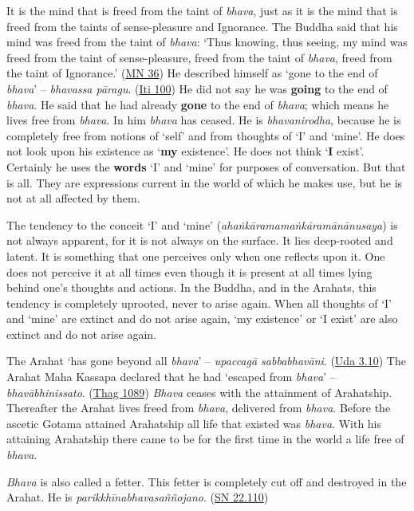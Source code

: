 It is the mind that is freed from the taint of \emph{bhava}, just as it is the mind that is freed from the taints of sense-pleasure and Ignorance. The Buddha said that his mind was freed from the taint of \emph{bhava}: `Thus knowing, thus seeing, my mind was freed from the taint of sense-pleasure, freed from the taint of \emph{bhava}, freed from the taint of Ignorance.' (\href{https://suttacentral.net/mn36/en/bodhi}{MN 36}) He described himself as `gone to the end of \emph{bhava}' -- \emph{bhavassa pāragu}. (\href{https://suttacentral.net/iti100/en/sujato}{Iti 100}) He did not say he was \textbf{going} to the end of \emph{bhava}. He said that he had already \textbf{gone} to the end of \emph{bhava}; which means he lives free from \emph{bhava}. In him \emph{bhava} has ceased. He is \emph{bhavanirodha}, because he is completely free from notions of `self' and from thoughts of `I' and `mine'. He does not look upon his existence as `\textbf{my} existence'. He does not think `\textbf{I} exist'. Certainly he uses the \textbf{words} `I' and `mine' for purposes of conversation. But that is all. They are expressions current in the world of which he makes use, but he is not at all affected by them.

The tendency to the conceit `I' and `mine' (\emph{ahaṅkāramamaṅkāramānānusaya}) is not always apparent, for it is not always on the surface. It lies deep-rooted and latent. It is something that one perceives only when one reflects upon it. One does not perceive it at all times even though it is present at all times lying behind one's thoughts and actions. In the Buddha, and in the Arahats, this tendency is completely uprooted, never to arise again. When all thoughts of `I' and `mine' are extinct and do not arise again, `my existence' or `I exist' are also extinct and do not arise again.

The Arahat `has gone beyond all \emph{bhava}' -- \emph{upaccagā sabbabhavāni}. (\href{https://suttacentral.net/ud3.10/en/sujato}{Uda 3.10}) The Arahat Maha Kassapa declared that he had `escaped from \emph{bhava}' -- \emph{bhavābhinissato}. (\href{https://suttacentral.net/thag18.1/en/sujato}{Thag 1089}) \emph{Bhava} ceases with the attainment of Arahatship. Thereafter the Arahat lives freed from \emph{bhava}, delivered from \emph{bhava}. Before the ascetic Gotama attained Arahatship all life that existed was \emph{bhava}. With his attaining Arahatship there came to be for the first time in the world a life free of \emph{bhava}.

\emph{Bhava} is also called a fetter. This fetter is completely cut off and destroyed in the Arahat. He is \emph{parikkhīnabhavasaññojano}. (\href{https://suttacentral.net/sn22.110/en/sujato}{SN 22.110})

